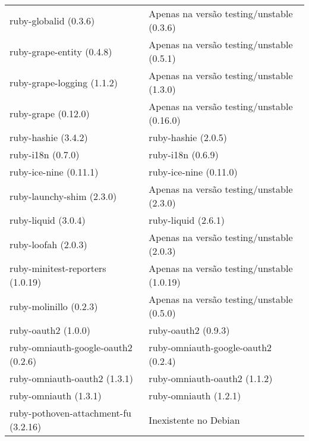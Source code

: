 \begin{anexosenv}
\begin{longtable}[H]{l|l}
        ruby-globalid (0.3.6)                            & Apenas na versão testing/unstable (0.3.6)  \\ 
        ruby-grape-entity (0.4.8)                        & Apenas na versão testing/unstable (0.5.1)  \\ 
        ruby-grape-logging (1.1.2)                       & Apenas na versão testing/unstable (1.3.0)  \\ 
        ruby-grape (0.12.0)                              & Apenas na versão testing/unstable (0.16.0) \\ 
        ruby-hashie (3.4.2)                              & ruby-hashie (2.0.5)                                               \\ 
        ruby-i18n (0.7.0)                                & ruby-i18n (0.6.9)                                                 \\ 
        ruby-ice-nine (0.11.1)                           & ruby-ice-nine (0.11.0)                                            \\ 
        ruby-launchy-shim (2.3.0)                        & Apenas na versão testing/unstable (2.3.0)  \\ 
        ruby-liquid (3.0.4)                              & ruby-liquid (2.6.1)                                               \\ 
        ruby-loofah (2.0.3)                              & Apenas na versão testing/unstable (2.0.3)  \\ 
        ruby-minitest-reporters (1.0.19)                 & Apenas na versão testing/unstable (1.0.19) \\ 
        ruby-molinillo (0.2.3)                           & Apenas na versão testing/unstable (0.5.0)  \\ 
        ruby-oauth2 (1.0.0)                              & ruby-oauth2 (0.9.3)                                               \\ 
        ruby-omniauth-google-oauth2 (0.2.6)              & ruby-omniauth-google-oauth2 (0.2.4)                               \\ 
        ruby-omniauth-oauth2 (1.3.1)                     & ruby-omniauth-oauth2 (1.1.2)                                      \\ 
        ruby-omniauth (1.3.1)                            & ruby-omniauth (1.2.1)                                             \\ 
        ruby-pothoven-attachment-fu (3.2.16)             & Inexistente no Debian                                             \\ 

\end{longtable}
\end{anexosenv}
